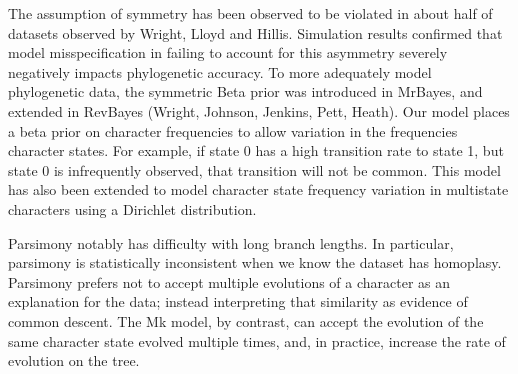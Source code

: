 \documentclass[]{article}
\begin{document}
The assumption of symmetry has been observed to be violated in about half of datasets observed by Wright, Lloyd and Hillis.
Simulation results confirmed that model misspecification in failing to account for this asymmetry severely negatively impacts phylogenetic accuracy.
To more adequately model phylogenetic data, the symmetric Beta prior was introduced in MrBayes, and extended in RevBayes (Wright, Johnson, Jenkins, Pett, Heath).
Our model places a beta prior on character frequencies to allow variation in the frequencies character states.
For example, if state 0 has a high transition rate to state 1, but state 0 is infrequently observed, that transition will not be common.
This model has also been extended to model character state frequency variation in multistate characters using a Dirichlet distribution. \par


Parsimony notably has difficulty with long branch lengths.
In particular, parsimony is statistically inconsistent when we know the dataset has homoplasy.
Parsimony prefers not to accept multiple evolutions of a character as an explanation for the data; instead interpreting that similarity as evidence of common descent. 
The Mk model, by contrast, can accept the evolution of the same character state evolved multiple times, and, in practice, increase the rate of evolution on the tree. \par


 
\end{document}
